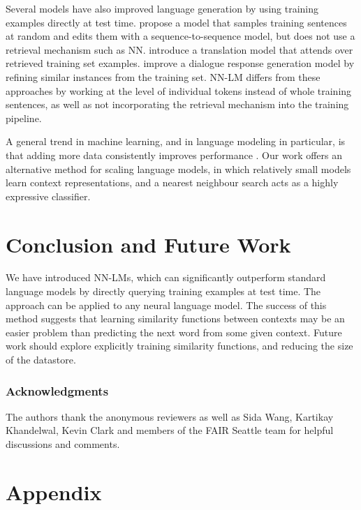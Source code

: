 \documentclass{article} \usepackage{iclr2020_conference,times}
\begin{document}
Several models have also improved language generation by using training examples directly at test time.
\citet{guu2018generating} propose a model that samples training sentences at random and edits them with a sequence-to-sequence model, but does not use a retrieval mechanism such as NN.
\citet{gu2018search} introduce a translation model that attends over retrieved training set examples.
\citet{weston2018retrieve} improve a dialogue response generation model by refining similar instances from the training set.
NN-LM differs from these approaches by working at the level of individual tokens instead of whole training sentences, as well as not incorporating the retrieval mechanism into the training pipeline.




A general trend in machine learning, and in language modeling in particular, is that adding more data consistently improves performance \citep{devlin2018bert,radford2019language,yang2019xlnet,liu2019roberta,zellers2019defending,shoeybi2019megatron}.
Our work offers an alternative method for scaling language models, in which relatively small models learn context representations, and a nearest neighbour search acts as a highly expressive classifier.
 

\section{Conclusion and Future Work}
We have introduced NN-LMs, which can significantly outperform standard language models by directly querying training examples at test time.
The approach can be applied to any neural language model.
The success of this method suggests that learning similarity functions between contexts may be an easier problem than predicting the next word from some given context.
Future work should explore explicitly training similarity functions, and reducing the size of the datastore. %
 
\subsubsection*{Acknowledgments}
The authors thank the anonymous reviewers as well as Sida Wang, Kartikay Khandelwal, Kevin Clark and members of the FAIR Seattle team for helpful discussions and comments.






\appendix
\clearpage
\section{Appendix}
\label{sec:appendix}
\end{document}
